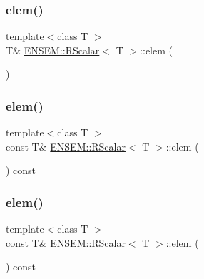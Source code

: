 \subsubsection{\texorpdfstring{elem()}{elem()}\hspace{0.1cm}{\footnotesize\ttfamily [2/4]}}
{\footnotesize\ttfamily template$<$class T $>$ \\
T\& \mbox{\hyperlink{classENSEM_1_1RScalar}{E\+N\+S\+E\+M\+::\+R\+Scalar}}$<$ T $>$\+::elem (\begin{DoxyParamCaption}{ }\end{DoxyParamCaption})\hspace{0.3cm}{\ttfamily [inline]}}

\mbox{\label{classENSEM_1_1RScalar_a26bfcd896407f15877920b5f737119fe}} 
\subsubsection{\texorpdfstring{elem()}{elem()}\hspace{0.1cm}{\footnotesize\ttfamily [3/4]}}
{\footnotesize\ttfamily template$<$class T $>$ \\
const T\& \mbox{\hyperlink{classENSEM_1_1RScalar}{E\+N\+S\+E\+M\+::\+R\+Scalar}}$<$ T $>$\+::elem (\begin{DoxyParamCaption}{ }\end{DoxyParamCaption}) const\hspace{0.3cm}{\ttfamily [inline]}}

\mbox{\label{classENSEM_1_1RScalar_a26bfcd896407f15877920b5f737119fe}} 
\subsubsection{\texorpdfstring{elem()}{elem()}\hspace{0.1cm}{\footnotesize\ttfamily [4/4]}}
{\footnotesize\ttfamily template$<$class T $>$ \\
const T\& \mbox{\hyperlink{classENSEM_1_1RScalar}{E\+N\+S\+E\+M\+::\+R\+Scalar}}$<$ T $>$\+::elem (\begin{DoxyParamCaption}{ }\end{DoxyParamCaption}) const\hspace{0.3cm}{\ttfamily [inline]}}

